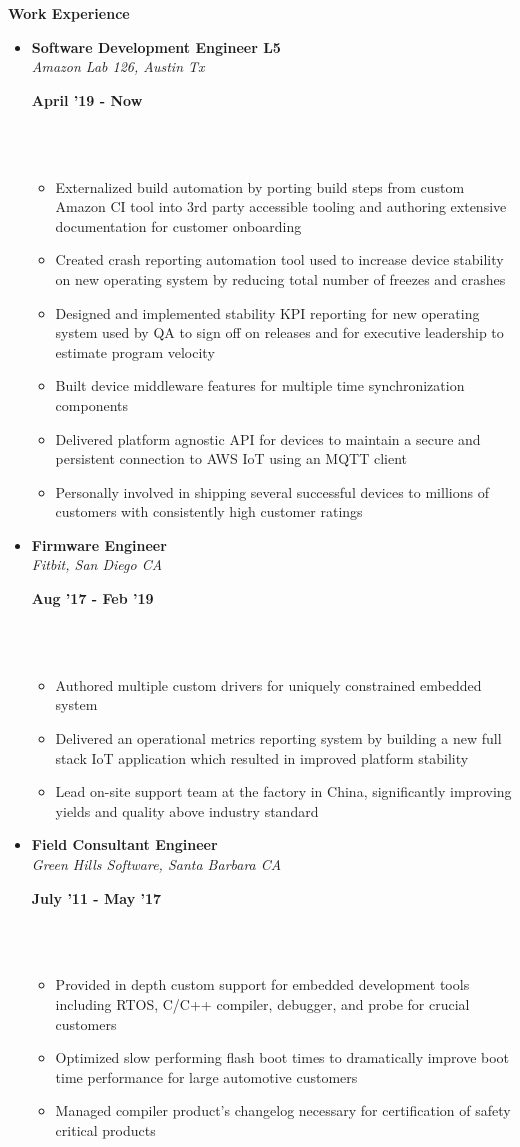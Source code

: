 \documentclass[a4paper,11pt]{article}
\newcommand{\isep}{0 pt}
\newcommand{\resheading}[1]{{\small \colorbox{mygrey}{\begin{minipage}{0.975\textwidth}{\textbf{#1 \vphantom{p\^{E}}}}\end{minipage}}}}
\newcommand{\workexp}[4]{
\begin{minipage}[t]{7cm}
\begin{flushleft}
\textbf{#1} \\
\indent \emph{#2}\\
\end{flushleft}
\end{minipage}
\hfill
\begin{minipage}[t]{7cm}
\begin{flushright}
\textbf{#3} \\
\indent #4 \\
\end{flushright}
\end{minipage}
\\[-0.10in]
}
\begin{document}
\resheading{\textbf{Work Experience}}
\begin{itemize}
\item
\workexp{Software Development Engineer L5}{Amazon Lab 126, Austin Tx}{April '19 - Now}{}
    \begin{itemize}\itemsep \isep
    	\item Externalized build automation by porting build steps from custom Amazon CI tool into 3rd party accessible tooling and authoring extensive documentation for customer onboarding
    	\item Created crash reporting automation tool used to increase device stability on new operating system by reducing total number of freezes and crashes
    	\item Designed and implemented stability KPI reporting for new operating system used by QA to sign off on releases and for executive leadership to estimate program velocity
    	\item Built device middleware features for multiple time synchronization components
        \item Delivered platform agnostic API for devices to maintain a secure and persistent connection to AWS IoT using an MQTT client
        \item Personally involved in shipping several successful devices to millions of customers with consistently high customer ratings
    \end{itemize}

\item
\workexp{Firmware Engineer}{Fitbit, San Diego CA}{Aug '17 - Feb '19}{}
    \begin{itemize}\itemsep \isep
        \item Authored multiple custom drivers for uniquely constrained embedded system
        \item Delivered an operational metrics reporting system by building a new full stack IoT application which resulted in improved platform stability
        \item Lead on-site support team at the factory in China, significantly improving yields and quality above industry standard
    \end{itemize}

\item
\workexp{Field Consultant Engineer}{Green Hills Software, Santa Barbara CA}{July '11 - May '17}{}
	\begin{itemize}\itemsep \isep
        \item Provided in depth custom support for embedded development tools including RTOS, C/C++ compiler, debugger, and probe for crucial customers
        \item Optimized slow performing flash boot times to dramatically improve boot time performance for large automotive customers
        \item Managed compiler product's changelog necessary for certification of safety critical products
	\end{itemize}


\end{itemize}
\end{document}
